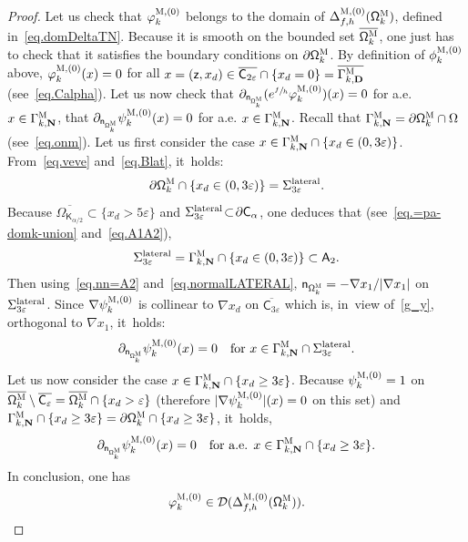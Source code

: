 \documentclass[JEP,XML,SOM,Unicode,NoEqCountersInSection,NoFloatCountersInSection,published]{cedram}
\newcommand{\mbf}[1]{\mathbf{#1}}
\let\pa\partial
\let\ve\varepsilon
\theoremstyle{plain}
\theoremstyle{definition}
\begin{document}
\begin{proof}
Let us check that $\varphi^{\textsc{M},(0)}_k$ belongs to the domain
of $\Delta_{f,h}^{\textsc{M}, (0)}(\mathsf \Omega_k^{\textsc{M}})$,
defined in~\eqref{eq.domDeltaTN}. Because it is smooth on the bounded set $\overline{\mathsf \Omega_k^{\textsc{M}}}$, one just has to check that it satisfies the boundary conditions on $\pa \mathsf \Omega_k^{\textsc{M}} $. By definition of $\phi^{\textsc{M},(0)}_k$ above, $\varphi^{\textsc{M},(0)}_k(x)=0$ for all $x=(\mathsf z,x_d) \in \overline{ \mathsf C_{2\ve}} \cap \{x_d =0\} = \overline{\Gamma_{k,\mbf D}^{\textsc{M}}}$ (see~\eqref{eq.Calpha}). Let us now check that $\pa _{\mathsf n_{ \mathsf \Omega_k^{\textsc{M}} }}(e^{\sfrac fh} \varphi^{\textsc{M},(0)}_k)(x)=0$ for a.e. $x\in \Gamma_{k,\mbf N}^{\textsc{M}}$, \ie that $\pa _{\mathsf n_{ \mathsf \Omega_k^{\textsc{M}} }}\psi^{\textsc{M},(0)}_k(x)=0$ for a.e. $x\in \Gamma_{k,\mbf N}^{\textsc{M}}$. Recall that $\Gamma_{k,\mbf N}^{\textsc{M}}=\pa \mathsf \Omega_k^{\textsc{M}} \cap \Omega$ (see~\eqref{eq.onm}). Let us first consider the case $x\in \Gamma_{k,\mbf N}^{\textsc{M}}\cap \{x_d\in (0,3\ve)\}$.
From~\eqref{eq.veve} and~\eqref{eq.Blat}, it~holds:
\begin{equation}\label{eq.=Sve}
\pa \mathsf \Omega_k^{\textsc{M}} \cap \{x_d\in (0,3\ve)\} =\Sigma_{3\ve}^{\textup{lateral}}.
\end{equation}
Because $\overline{\Omega_{\mathsf K_{\alpha/2}}} \!\subset\! \{x_d\!>\! 5\ve\}$ and $\Sigma_{3\ve}^{\textup{lateral}} \!\subset\! \pa \mathsf C_\alpha$, one deduces that (see~\eqref{eq.=pa-domk-union} and~\eqref{eq.A1A2}),
\[
\Sigma_{3\ve}^{\textup{lateral}}= \Gamma_{k,\mbf N}^{\textsc{M}}\cap \{x_d\in (0,3\ve)\} \subset \mathsf A_2.
\]
Then using~\eqref{eq.nn=A2} and~\eqref{eq.normalLATERAL}, $\mathsf n_{ \mathsf \Omega_k^{\textsc{M}}}=- {\nabla x_1}/ {\vert \nabla x_1\vert}$ on $\Sigma_{3\ve}^{\textup{lateral}}$. Since $\nabla \psi^{\textsc{M},(0)}_k$ is collinear to $\nabla x_d$ on $\overline{ \mathsf C_{3\ve} }$ which is, in~view of~\eqref{g_y}, orthogonal to $\nabla x_1$, it~holds:
\[
\pa _{\mathsf n_{ \mathsf \Omega_k^{\textsc{M}} }}\psi^{\textsc{M},(0)}_k(x)=0 \quad\text{for } x \in \Gamma_{k,\mbf N}^{\textsc{M}} \cap \Sigma_{3\ve}^{\textup{lateral}}.
\]
Let us now consider the case $x\in \Gamma_{k,\mbf N}^{\textsc{M}}\cap \{x_d\ge 3\ve\}$.
Because $\psi^{\textsc{M},(0)}_k=1$ on $ \overline{\mathsf \Omega_k^{\textsc{M}} }\setminus \overline{\mathsf C_{\ve}}= \overline{\mathsf \Omega_k^{\textsc{M}} }\cap\{x_d>\ve\}$ (therefore $\vert \nabla \psi^{\textsc{M},(0)}_k\vert (x)=0$ on this set) and $\Gamma_{k,\mbf N}^{\textsc{M}}\cap\{x_d\ge 3\ve\}= \pa \mathsf \Omega_k^{\textsc{M}} \cap\{x_d\ge 3\ve\}$, it~holds,
\[
\pa _{\mathsf n_{ \mathsf \Omega_k^{\textsc{M}} }}\psi^{\textsc{M},(0)}_k(x)=0 \quad\text{for a.e. } x\in \Gamma_{k,\mbf N}^{\textsc{M}}\cap\{x_d\ge 3\ve\}.
\]
In conclusion, one has
\begin{equation}\label{eq.psi-DM}
\varphi^{\textsc{M},(0)}_k \in \mathcal D(\Delta_{f,h}^{\textsc{M}, (0)}(\mathsf \Omega_k^{\textsc{M}})).
\end{equation}


\end{proof}
\end{document}
